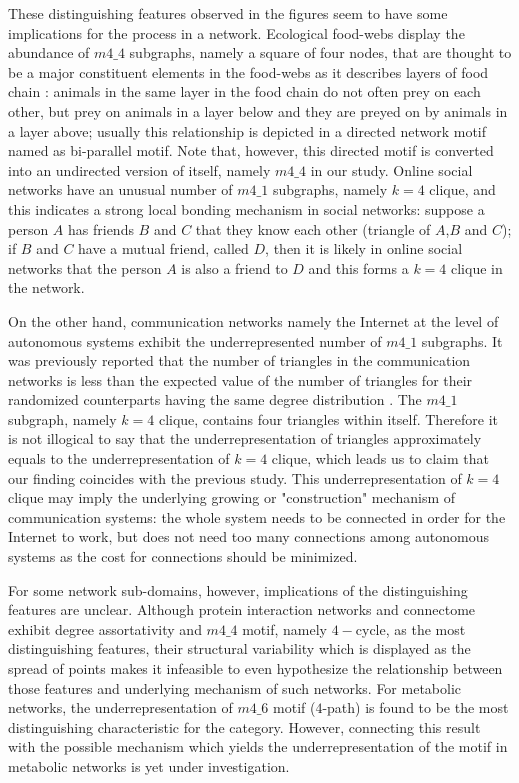 \documentclass[..]{revtex4}
\begin{document}
These distinguishing features observed in the figures seem to have some implications for the process in a network. Ecological food-webs display the abundance of $m4\_4$ subgraphs, namely a square of four nodes, that are thought to be a major constituent elements in the food-webs as it describes layers of food chain \cite{Milo_motif,BiParallel}: animals in the same layer in the food chain do not often prey on each other, but prey on animals in a layer below and they are preyed on by animals in a layer above; usually this relationship is depicted in a directed network motif named as bi-parallel motif. Note that, however, this directed motif is converted into an undirected version of itself, namely $m4\_4$ in our study. Online social networks have an unusual number of $m4\_1$ subgraphs, namely $k = 4$ clique, and this indicates a strong local bonding mechanism in social networks: suppose a person $A$ has friends $B$ and $C$ that they know each other (triangle of $A$,$B$ and $C$); if $B$ and $C$ have a mutual friend, called $D$, then it is likely in online social networks that the person $A$ is also a friend to $D$ and this forms a $k=4$ clique in the network.  

On the other hand, communication networks namely the Internet at the level of autonomous systems exhibit the underrepresented number of  $m4\_1$ subgraphs. It was previously reported that the number of triangles in the communication networks is less than the expected value of the number of triangles for their randomized counterparts having the same degree distribution \cite{InternetClustering}. The $m4\_1$ subgraph, namely $k=4$ clique, contains four triangles within itself. Therefore it is not illogical to say that the underrepresentation of triangles approximately equals to the underrepresentation of $k=4$ clique, which leads us to claim that our finding coincides with the previous study. This underrepresentation of $k=4$ clique may imply the underlying growing or "construction" mechanism of communication systems: the whole system needs to be connected in order for the Internet to work, but does not need too many connections among autonomous systems as the cost for connections should be minimized. 

For some network sub-domains, however, implications of the distinguishing features are unclear. Although protein interaction networks and connectome exhibit degree assortativity and $m4\_4$ motif, namely $4-$cycle, as the most distinguishing features, their structural variability which is displayed as the spread of points makes it infeasible to even hypothesize the relationship between those features and underlying mechanism of such networks. For metabolic networks, the underrepresentation of $m4\_6$ motif ($4$-path) is found to be the most distinguishing characteristic for the category. However, connecting this result with the possible mechanism which yields the underrepresentation of the motif in metabolic networks is yet under investigation.
\end{document}
